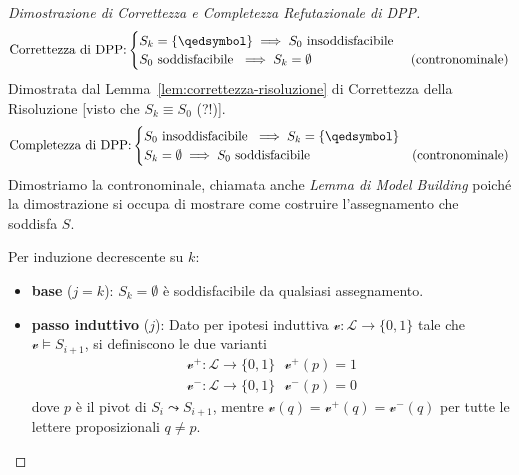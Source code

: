 \begin{proof}[Dimostrazione di  Correttezza e Completezza Refutazionale di DPP]
$$
\text{Correttezza di DPP:}
\begin{cases}
  S_k = \{\qedsymbol\} \implies S_0 \text{ insoddisfacibile } \\
  S_0 \text{ soddisfacibile } \implies S_k = \emptyset & \text{(contronominale)}
\end{cases}
$$
Dimostrata dal Lemma~\ref{lem:correttezza-risoluzione} di Correttezza della Risoluzione {[visto che $S_k \equiv S_0$ (?!)]}.
$$
\text{Completezza di DPP:}
\begin{cases}
  S_0 \text{ insoddisfacibile } \implies S_k = \{\qedsymbol\} \\
  S_k = \emptyset \implies S_0 \text{ soddisfacibile } & \text{(contronominale)}
\end{cases}
$$
Dimostriamo la contronominale, chiamata anche \textit{Lemma di Model Building} poiché la dimostrazione si occupa di mostrare come costruire l'assegnamento che soddisfa $S$. 

Per induzione decrescente su $k$:
\begin{itemize}
  \item \textbf{base} ($j = k$): $S_k = \emptyset$ è soddisfacibile da qualsiasi assegnamento.
  \item \textbf{passo induttivo} ($j$): Dato per ipotesi induttiva $\mathcal{v} : \mathscr{L} \rightarrow \{0,1\}$ tale che $\mathcal{v} \models S_{i+1}$, si definiscono le due varianti 
  \begin{align*}
    \mathcal{v}^+ : \mathscr{L} \rightarrow \{0,1\} ~~~ \mathcal{v}^+(p) = 1 \\
    \mathcal{v}^- : \mathscr{L} \rightarrow \{0,1\} ~~~ \mathcal{v}^-(p) = 0
  \end{align*}
  dove $p$ è il pivot di $S_i \leadsto S_{i+1}$, mentre $\mathcal{v}(q) = \mathcal{v}^+(q) = \mathcal{v}^-(q)$ per tutte le lettere proposizionali $q \neq p$.
  

\end{itemize}
\end{proof}
